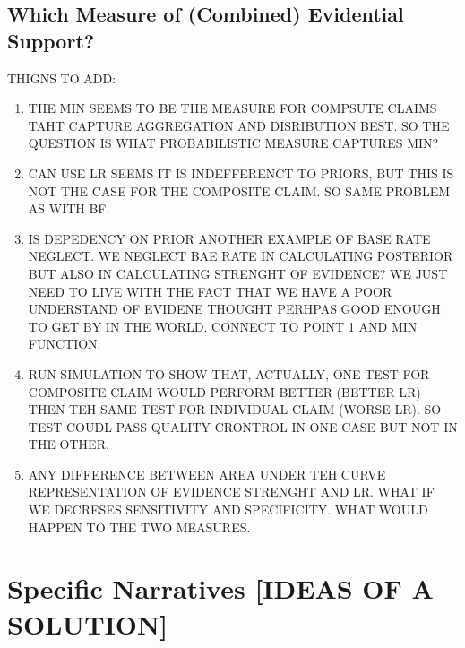 \documentclass[10pt,dvipsnames,enabledeprecatedfontcommands]{scrartcl}
\begin{document}
\hypertarget{which-measure-of-combined-evidential-support}{%
\subsection{Which Measure of (Combined) Evidential
Support?}\label{which-measure-of-combined-evidential-support}}

THIGNS TO ADD:

\begin{enumerate}
\def\labelenumi{\arabic{enumi}.}
\item
  THE MIN SEEMS TO BE THE MEASURE FOR COMPSUTE CLAIMS TAHT CAPTURE
  AGGREGATION AND DISRIBUTION BEST. SO THE QUESTION IS WHAT
  PROBABILISTIC MEASURE CAPTURES MIN?
\item
  CAN USE LR SEEMS IT IS INDEFFERENCT TO PRIORS, BUT THIS IS NOT THE
  CASE FOR THE COMPOSITE CLAIM. SO SAME PROBLEM AS WITH BF.
\item
  IS DEPEDENCY ON PRIOR ANOTHER EXAMPLE OF BASE RATE NEGLECT. WE NEGLECT
  BAE RATE IN CALCULATING POSTERIOR BUT ALSO IN CALCULATING STRENGHT OF
  EVIDENCE? WE JUST NEED TO LIVE WITH THE FACT THAT WE HAVE A POOR
  UNDERSTAND OF EVIDENE THOUGHT PERHPAS GOOD ENOUGH TO GET BY IN THE
  WORLD. CONNECT TO POINT 1 AND MIN FUNCTION.
\item
  RUN SIMULATION TO SHOW THAT, ACTUALLY, ONE TEST FOR COMPOSITE CLAIM
  WOULD PERFORM BETTER (BETTER LR) THEN TEH SAME TEST FOR INDIVIDUAL
  CLAIM (WORSE LR). SO TEST COUDL PASS QUALITY CRONTROL IN ONE CASE BUT
  NOT IN THE OTHER.
\item
  ANY DIFFERENCE BETWEEN AREA UNDER TEH CURVE REPRESENTATION OF EVIDENCE
  STRENGHT AND LR. WHAT IF WE DECRESES SENSITIVITY AND SPECIFICITY. WHAT
  WOULD HAPPEN TO THE TWO MEASURES.
\end{enumerate}

\hypertarget{specific-narratives-ideas-of-a-solution}{%
\section{Specific Narratives {[}IDEAS OF A
SOLUTION{]}}\label{specific-narratives-ideas-of-a-solution}}
\end{document}
